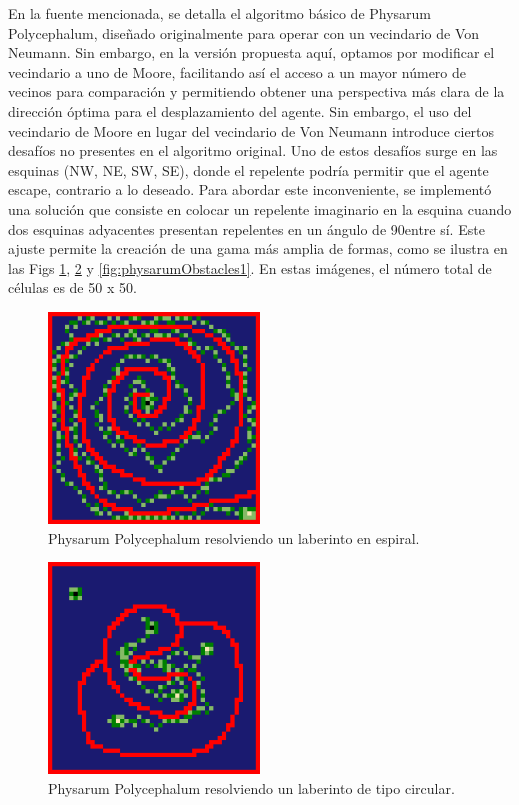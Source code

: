     \vskip 0.5cm
    En la fuente mencionada, se detalla el algoritmo b\'asico de Physarum Polycephalum, dise\~nado originalmente para operar con un vecindario de Von 
        Neumann. Sin embargo, en la versi\'on propuesta aqu\'i, optamos por modificar el vecindario a uno de Moore, 
        facilitando as\'i el acceso a un mayor n\'umero de vecinos para comparaci\'on y permitiendo obtener una perspectiva m\'as clara de la direcci\'on \'optima 
        para el desplazamiento del agente.
    Sin embargo, el uso del vecindario de Moore en lugar del vecindario de Von Neumann introduce ciertos desaf\'ios no presentes en el algoritmo original. 
        Uno de estos desaf\'ios surge en las esquinas (NW, NE, SW, SE), donde el repelente podr\'ia permitir que el agente escape, 
        contrario a lo deseado. Para abordar este inconveniente, se implement\'o una soluci\'on que consiste en colocar un repelente imaginario en la esquina cuando 
        dos esquinas adyacentes presentan repelentes en un \'angulo de 90\degree  entre s\'i. Este ajuste permite la creaci\'on de una gama m\'as amplia de formas, 
        como se ilustra en las Figs \ref{fig:physarumCircle1}, 
        \ref{fig:physarumRandom1} y \ref{fig:physarumObstacles1}. En estas im\'agenes, el n\'umero total de c\'elulas es de 50 x 50.
    \vskip 0.5cm
    \begin{figure}[htbp]
        \centerline{\includegraphics[width=0.5\textwidth]{./images/desarrollo/physarum/Circular1.png}}
        \caption{Physarum Polycephalum resolviendo un laberinto en espiral.} 
        \label{fig:physarumCircle1}    
    \end{figure}
    \begin{figure}[htbp]
        \centerline{\includegraphics[width=0.5\textwidth]{./images/desarrollo/physarum/Random1.png}}
        \caption{Physarum Polycephalum resolviendo un laberinto de tipo circular.}
        \label{fig:physarumRandom1}    
    \end{figure}
